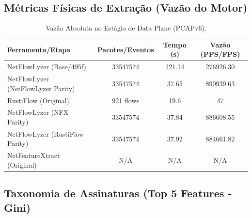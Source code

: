 \documentclass[11pt,a4paper]{article}
\begin{document}
\subsection{Métricas Físicas de Extração (Vazão do Motor)}
\begin{table}[H]
\centering
\begin{threeparttable}
\begin{tabular}{lccc}
\toprule
\textbf{Ferramenta/Etapa} & \textbf{Pacotes/Eventos} & \textbf{Tempo (s)} & \textbf{Vazão (PPS/FPS)} \\
\midrule
NetFlowLyzer (Base/495f) & 33547574 & 121.14 & 276926.30 \\
NetFlowLyzer (NetFlowLyzer Parity) & 33547574 & 37.65 & 890939.63 \\
RustiFlow (Original) & 921 flows & 19.6 & 47 \\
NetFlowLyzer (NFX Parity) & 33547574 & 37.84 & 886608.55 \\
NetFlowLyzer (RustiFlow Parity) & 33547574 & 37.92 & 884661.82 \\
NetFeatureXtract (Original) & N/A & N/A & N/A \\
\bottomrule
\end{tabular}
\end{threeparttable}
\caption{Vazão Absoluta no Estágio de Data Plane (PCAPv6).}
\end{table}

\subsection{Taxonomia de Assinaturas (Top 5 Features - Gini)}
\begin{table}[H]
\centering
{}
\caption{Principais atributos de correlação estocástica por limiar dimensional (PCAPv6).}
\end{table}
\end{document}
